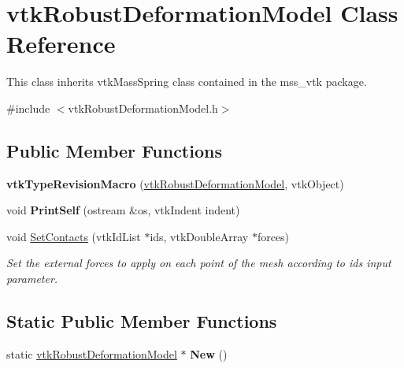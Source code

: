 \hypertarget{classvtkRobustDeformationModel}{
\section{vtkRobustDeformationModel Class Reference}
\label{classvtkRobustDeformationModel}
}


This class inherits vtkMassSpring class contained in the mss\_\-vtk package.  




{\ttfamily \#include $<$vtkRobustDeformationModel.h$>$}

\subsection*{Public Member Functions}
\begin{DoxyCompactItemize}
\item 
\hypertarget{classvtkRobustDeformationModel_afe8cb1ad560a72c68f99433f1aa3498a}{
{\bfseries vtkTypeRevisionMacro} (\hyperlink{classvtkRobustDeformationModel}{vtkRobustDeformationModel}, vtkObject)}
\label{classvtkRobustDeformationModel_afe8cb1ad560a72c68f99433f1aa3498a}

\item 
\hypertarget{classvtkRobustDeformationModel_afcc90c29d7df1c88f46e24af0a4268fd}{
void {\bfseries PrintSelf} (ostream \&os, vtkIndent indent)}
\label{classvtkRobustDeformationModel_afcc90c29d7df1c88f46e24af0a4268fd}

\item 
void \hyperlink{classvtkRobustDeformationModel_a0ca4b7ead2c60259b55fdf483c022b30}{SetContacts} (vtkIdList $\ast$ids, vtkDoubleArray $\ast$forces)
\begin{DoxyCompactList}\small\item\em Set the external forces to apply on each point of the mesh according to ids input parameter. \item\end{DoxyCompactList}\end{DoxyCompactItemize}
\subsection*{Static Public Member Functions}
\begin{DoxyCompactItemize}
\item 
\hypertarget{classvtkRobustDeformationModel_a4b02cc2f1212b0ef2723b852458788e3}{
static \hyperlink{classvtkRobustDeformationModel}{vtkRobustDeformationModel} $\ast$ {\bfseries New} ()}
\label{classvtkRobustDeformationModel_a4b02cc2f1212b0ef2723b852458788e3}

\end{DoxyCompactItemize}


